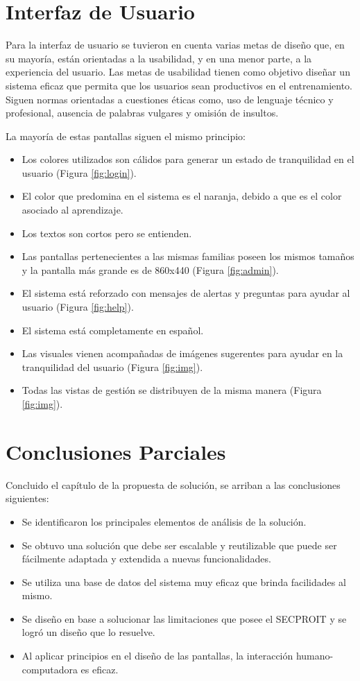 
\section{Interfaz de Usuario}
Para la interfaz de usuario se tuvieron en cuenta varias metas de diseño que, en su mayoría, están orientadas a la usabilidad, y en una menor parte, a la experiencia del usuario. Las metas de usabilidad tienen como objetivo diseñar un sistema eficaz que permita que los usuarios sean productivos en el entrenamiento. Siguen normas orientadas a cuestiones éticas como, uso de lenguaje técnico y profesional, ausencia de palabras vulgares y omisión de insultos.

La mayoría de estas pantallas siguen el mismo principio:

\begin{itemize}
\item Los colores utilizados son cálidos para generar un estado de tranquilidad en el usuario (Figura \ref{fig:login}).
\item El color que predomina en el sistema es el naranja, debido a que es el color asociado al aprendizaje.
\item Los textos son cortos pero se entienden.
\item Las pantallas pertenecientes a las mismas familias poseen los mismos tamaños y la pantalla más grande es de 860x440 (Figura \ref{fig:admin}).
\item El sistema está reforzado con mensajes de alertas y preguntas para ayudar al usuario (Figura \ref{fig:help}).
\item El sistema está completamente en español.
\item Las visuales vienen acompañadas de imágenes sugerentes para ayudar en la tranquilidad del usuario (Figura \ref{fig:img}).
\item Todas las vistas de gestión se distribuyen de la misma manera (Figura \ref{fig:img}).
\end{itemize}


\section{Conclusiones Parciales}
Concluido el capítulo de la propuesta de solución, se arriban a las conclusiones siguientes:

\begin{itemize}
\item Se identificaron los principales elementos de análisis de la solución.
\item Se obtuvo una solución que debe ser escalable y reutilizable que puede ser fácilmente adaptada y extendida a nuevas funcionalidades.
\item Se utiliza una base de datos del sistema muy eficaz que brinda facilidades al mismo.
\item Se diseño en base a solucionar las limitaciones que posee el SECPROIT y se logró un diseño que lo resuelve.
\item Al aplicar principios en el diseño de las pantallas, la interacción humano-computadora es eficaz.
\end{itemize}
